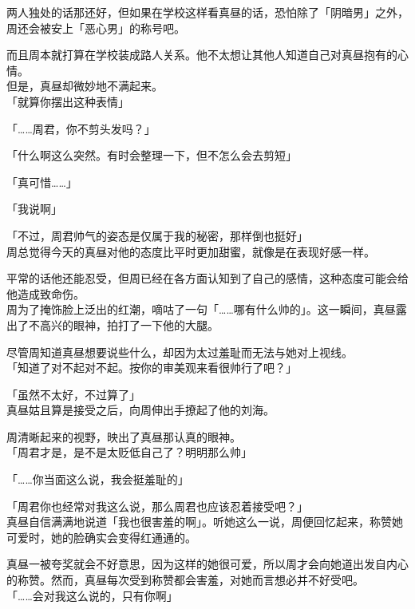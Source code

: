 两人独处的话那还好，但如果在学校这样看真昼的话，恐怕除了「阴暗男」之外，周还会被安上「恶心男」的称号吧。

而且周本就打算在学校装成路人关系。他不太想让其他人知道自己对真昼抱有的心情。\\

但是，真昼却微妙地不满起来。\\

「就算你摆出这种表情」

「……周君，你不剪头发吗？」

「什么啊这么突然。有时会整理一下，但不怎么会去剪短」

「真可惜……」

「我说啊」

「不过，周君帅气的姿态是仅属于我的秘密，那样倒也挺好」\\

周总觉得今天的真昼对他的态度比平时更加甜蜜，就像是在表现好感一样。

平常的话他还能忍受，但周已经在各方面认知到了自己的感情，这种态度可能会给他造成致命伤。\\

周为了掩饰脸上泛出的红潮，嘀咕了一句「……哪有什么帅的」。这一瞬间，真昼露出了不高兴的眼神，拍打了一下他的大腿。

尽管周知道真昼想要说些什么，却因为太过羞耻而无法与她对上视线。\\

「知道了对不起对不起。按你的审美观来看很帅行了吧？」

「虽然不太好，不过算了」\\

真昼姑且算是接受之后，向周伸出手撩起了他的刘海。

周清晰起来的视野，映出了真昼那认真的眼神。\\

「周君才是，是不是太贬低自己了？明明那么帅」

「……你当面这么说，我会挺羞耻的」

「周君你也经常对我这么说，那么周君也应该忍着接受吧？」\\

真昼自信满满地说道「我也很害羞的啊」。听她这么一说，周便回忆起来，称赞她可爱时，她的脸确实会变得红通通的。

真昼一被夸奖就会不好意思，因为这样的她很可爱，所以周才会向她道出发自内心的称赞。然而，真昼每次受到称赞都会害羞，对她而言想必并不好受吧。\\

「……会对我这么说的，只有你啊」


